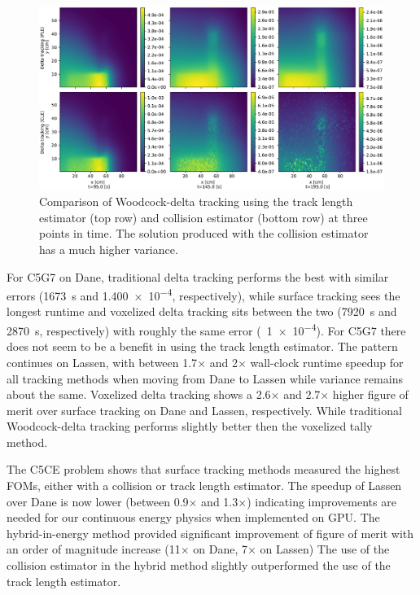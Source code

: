 

\begin{figure}
    \centering
    \includegraphics[width=\textwidth]{figures/delta_figs/cle_v_tle.pdf}
    \caption{Comparison of Woodcock-delta tracking using the track length estimator (top row) and collision estimator (bottom row) at three points in time. The solution produced with  the collision estimator has a much higher variance.}
    \label{fig:koby}
\end{figure}

For C5G7 on Dane, traditional delta tracking performs the best with similar errors (\SI{1673}{\s} and \num{1.400e-4}, respectively), while surface tracking sees the longest runtime and voxelized delta tracking sits between the two (\SI{7920}{\s} and \SI{2870}{\s}, respectively) with roughly the same error (~\num{1e-4}).
For C5G7 there does not seem to be a benefit in using the track length estimator.
The pattern continues on Lassen, with between \num{1.7}$\times$ and \num{2}$\times$ wall-clock runtime speedup for all tracking methods when moving from Dane to Lassen while variance remains about the same.
Voxelized delta tracking shows a \num{2.6}$\times$ and \num{2.7}$\times$ higher figure of merit over surface tracking on Dane and Lassen, respectively.
While traditional Woodcock-delta tracking performs slightly better then the voxelized tally method.

The C5CE problem shows that surface tracking methods measured the highest FOMs, either with a collision or track length estimator.
The speedup of Lassen over Dane is now lower (between \num{0.9}$\times$ and \num{1.3}$\times$) indicating improvements are needed for our continuous energy physics when implemented on GPU.
The hybrid-in-energy method provided significant improvement of figure of merit with an order of magnitude increase (\num{11}$\times$ on Dane, \num{7}$\times$ on Lassen) 
The use of the collision estimator in the hybrid method slightly outperformed the use of the track length estimator.

